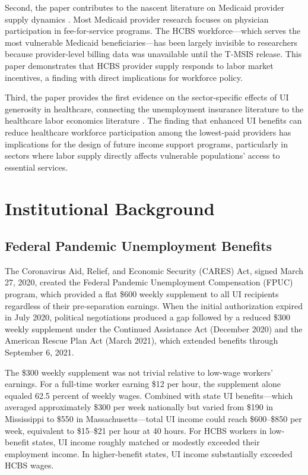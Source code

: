 \documentclass[12pt]{article}
\begin{document}
Second, the paper contributes to the nascent literature on Medicaid provider supply dynamics \citep{dague2023, zuckerman2021}. Most Medicaid provider research focuses on physician participation in fee-for-service programs. The HCBS workforce---which serves the most vulnerable Medicaid beneficiaries---has been largely invisible to researchers because provider-level billing data was unavailable until the T-MSIS release. This paper demonstrates that HCBS provider supply responds to labor market incentives, a finding with direct implications for workforce policy.

Third, the paper provides the first evidence on the sector-specific effects of UI generosity in healthcare, connecting the unemployment insurance literature to the healthcare labor economics literature \citep{staiger2010, autor2020}. The finding that enhanced UI benefits can reduce healthcare workforce participation among the lowest-paid providers has implications for the design of future income support programs, particularly in sectors where labor supply directly affects vulnerable populations' access to essential services.


\section{Institutional Background}

\subsection{Federal Pandemic Unemployment Benefits}

The Coronavirus Aid, Relief, and Economic Security (CARES) Act, signed March 27, 2020, created the Federal Pandemic Unemployment Compensation (FPUC) program, which provided a flat \$600 weekly supplement to all UI recipients regardless of their pre-separation earnings. When the initial authorization expired in July 2020, political negotiations produced a gap followed by a reduced \$300 weekly supplement under the Continued Assistance Act (December 2020) and the American Rescue Plan Act (March 2021), which extended benefits through September 6, 2021.

The \$300 weekly supplement was not trivial relative to low-wage workers' earnings. For a full-time worker earning \$12 per hour, the supplement alone equaled 62.5 percent of weekly wages. Combined with state UI benefits---which averaged approximately \$300 per week nationally but varied from \$190 in Mississippi to \$550 in Massachusetts---total UI income could reach \$600--\$850 per week, equivalent to \$15--\$21 per hour at 40 hours. For HCBS workers in low-benefit states, UI income roughly matched or modestly exceeded their employment income. In higher-benefit states, UI income substantially exceeded HCBS wages.
\end{document}
